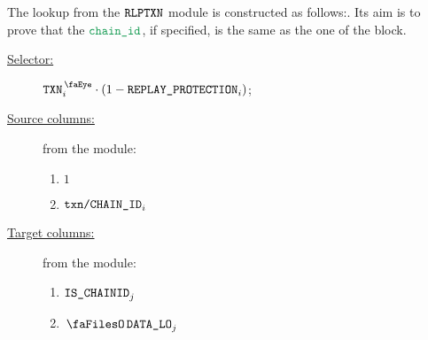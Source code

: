 The lookup from the $\texttt{RLPTXN}$ module is constructed as follows:. Its aim is to prove that the $\locChainId$, if specified, is the same as the one of the block.
\begin{description}
	\item[\underline{Selector:}] $\isTxn _{i} \cdot (1 - \rlpTxnCommonColumnReplayProtection _{i})$;
	\item[\underline{Source columns:}] from the \rlpTxnMod{} module:
	\begin{multicols}{2}
	\begin{enumerate}
		\item $1$
		\item $\texttt{txn}\texttt{/}\texttt{{CHAIN\_ID}} _{i}$
	\end{enumerate}
	\end{multicols}
\item[\underline{Target columns:}] from the \btcMod{} module: 
	\begin{multicols}{2}
	\begin{enumerate}
		\item $\texttt{IS\_CHAINID}   _{j}$
		\item $\blockDataLo _{j}$
	\end{enumerate} 
	\end{multicols}
\end{description}
